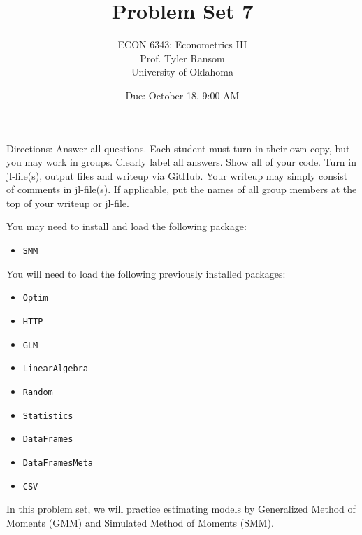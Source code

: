 \documentclass[12pt,english]{article}
\begin{document}
\title{Problem Set 7}
\author{ECON 6343: Econometrics III\\
Prof. Tyler Ransom\\
University of Oklahoma}
\date{Due: October 18, 9:00 AM}

\maketitle
Directions: Answer all questions. Each student must turn in their own copy, but you may work in groups. Clearly label all answers. Show all of your code. Turn in jl-file(s), output files and writeup via GitHub. Your writeup may simply consist of comments in jl-file(s). If applicable, put the names of all group members at the top of your writeup or jl-file.

You may need to install and load the following package:
\begin{itemize}
 \item[~] \texttt{SMM}
\end{itemize}

You will need to load the following previously installed packages:
\begin{itemize}
    \item[~] \texttt{Optim} 
    \item[~] \texttt{HTTP} 
    \item[~] \texttt{GLM} 
    \item[~] \texttt{LinearAlgebra} 
    \item[~] \texttt{Random} 
    \item[~] \texttt{Statistics} 
    \item[~] \texttt{DataFrames} 
    \item[~] \texttt{DataFramesMeta} 
    \item[~] \texttt{CSV} 
\end{itemize}
\pagebreak
In this problem set, we will practice estimating models by Generalized Method of Moments (GMM) and Simulated Method of Moments (SMM).
\end{document}
